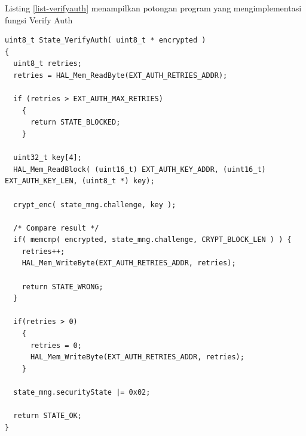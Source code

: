 Listing \ref{list-verifyauth} menampilkan potongan program yang mengimplementasi fungsi Verify Auth

\begin{lstlisting}[caption={Listing Program Fungsi Verify Auth}, label={list-verifyauth}]
uint8_t State_VerifyAuth( uint8_t * encrypted )
{
  uint8_t retries;
  retries = HAL_Mem_ReadByte(EXT_AUTH_RETRIES_ADDR);

  if (retries > EXT_AUTH_MAX_RETRIES)
    {
      return STATE_BLOCKED;
    }

  uint32_t key[4];
  HAL_Mem_ReadBlock( (uint16_t) EXT_AUTH_KEY_ADDR, (uint16_t) EXT_AUTH_KEY_LEN, (uint8_t *) key);

  crypt_enc( state_mng.challenge, key );

  /* Compare result */
  if( memcmp( encrypted, state_mng.challenge, CRYPT_BLOCK_LEN ) ) {
    retries++;
    HAL_Mem_WriteByte(EXT_AUTH_RETRIES_ADDR, retries);

    return STATE_WRONG;
  }

  if(retries > 0)
    {
      retries = 0;
      HAL_Mem_WriteByte(EXT_AUTH_RETRIES_ADDR, retries);
    }

  state_mng.securityState |= 0x02;

  return STATE_OK;
}
\end{lstlisting}

